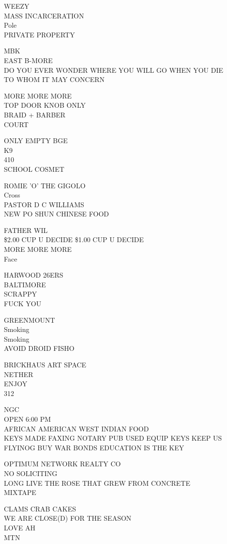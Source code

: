 \documentclass[10pt,letterpaper]{article}
\begin{document}
WEEZY\\
MASS INCARCERATION\\
Pole\\
PRIVATE PROPERTY

MBK\\
EAST B{-}MORE\\
DO YOU EVER WONDER WHERE YOU WILL GO WHEN YOU DIE\\
TO WHOM IT MAY CONCERN

MORE MORE MORE\\
TOP DOOR KNOB ONLY\\
BRAID + BARBER\\
COURT

ONLY EMPTY BGE\\
K9\\
410\\
SCHOOL COSMET

ROMIE 'O' THE GIGOLO\\
Cross\\
PASTOR D C WILLIAMS\\
NEW PO SHUN CHINESE FOOD

FATHER WIL\\
\$2.00 CUP U DECIDE \$1.00 CUP U DECIDE\\
MORE MORE MORE\\
Face

HARWOOD 26ERS\\
BALTIMORE\\
SCRAPPY\\
FUCK YOU

GREENMOUNT\\
Smoking\\
Smoking\\
AVOID DROID FISHO

BRICKHAUS ART SPACE\\
NETHER\\
ENJOY\\
312

NGC\\
OPEN 6:00 PM\\
AFRICAN AMERICAN WEST INDIAN FOOD\\
KEYS MADE FAXING NOTARY PUB USED EQUIP KEYS KEEP US FLYINOG BUY WAR BONDS EDUCATION IS THE KEY

OPTIMUM NETWORK REALTY CO\\
NO SOLICITING\\
LONG LIVE THE ROSE THAT GREW FROM CONCRETE\\
MIXTAPE

CLAMS CRAB CAKES\\
WE ARE CLOSE(D) FOR THE SEASON\\
LOVE AH\\
MTN
\end{document}
